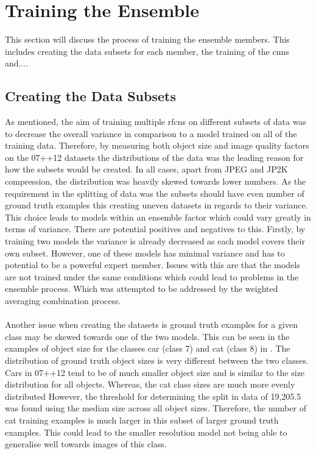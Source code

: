 \section{Training the Ensemble}
This section will discuss the process of training the ensemble members. This includes creating the data subsets for each member, the training of the \glspl{cnn} and.... 

\subsection{Creating the Data Subsets}
As mentioned, the aim of training multiple \glspl{rfcn} on different subsets of data was to decrease the overall variance in comparison to a model trained on all of the training data. Therefore, by measuring both object size and image quality factors on the 07++12 datasets the distributions of the data was the leading reason for how the subsets would be created. In all cases, apart from JPEG and JP2K compression, the distribution was heavily skewed towards lower numbers. As the requirement in the splitting of data was the subsets should have even number of ground truth examples this creating uneven datasets in regards to their variance. This choice leads to models within an ensemble factor which could vary greatly in terms of variance. There are potential positives and negatives to this. Firstly, by training two models the variance is already decreased as each model covers their own subset. However, one of these models has minimal variance and has to potential to be a powerful expert member. Issues with this are that the models are not trained under the same conditions which could lead to problems in the ensemble process. Which was attempted to be addressed by the weighted averaging combination process.
\\\\
Another issue when creating the datasets is ground truth examples for a given class may be skewed towards one of the two models. This can be seen in the examples of object size for the classes car (class 7) and cat (class 8) in . The distribution of ground truth object sizes is very different between the two classes. Cars in 07++12 tend to be of much smaller object size and is similar to the size distribution for all objects. Whereas, the cat class sizes are much more evenly distributed  However, the threshold for determining the split in data of 19,205.5 was found using the median size across all object sizes. Therefore, the number of cat training examples is much larger in this subset of larger ground truth examples. This could lead to the smaller resolution model not being able to generalise well towards images of this class.


